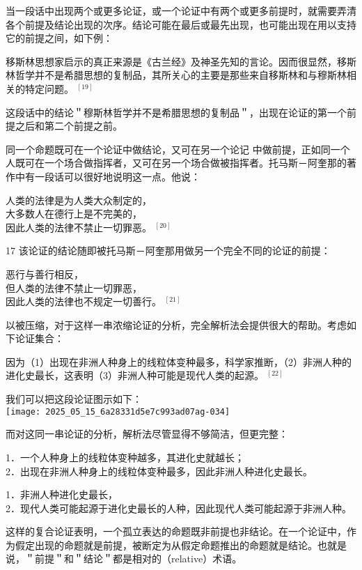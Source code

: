 当一段话中出现两个或更多论证，或一个论证中有两个或更多前提时，就需要弄清各个前提及结论出现的次序。结论可能在最后或最先出现，也可能出现在用以支持它的前提之间，如下例：

移斯林思想家启示的真正来源是《古兰经》及神圣先知的言论。因而很显然，移斯林哲学并不是希腊思想的复制品，其所关心的主要是那些来自移斯林和与穆斯林相关的特定问题。 ${ }^{[19]}$

这段话中的结论＂穆斯林哲学并不是希腊思想的复制品＂，出现在论证的第一个前提之后和第二个前提之前。

同一个命题既可在一个论证中做结论，又可在另一个论记 中做前提，正如同一个人既可在一个场合做指挥者，又可在另一个场合做被指挥者。托马斯－阿奎那的著作中有一段话可以很好地说明这一点。他说：

\begin{displayquote}
人类的法律是为人类大众制定的，\\
大多数人在德行上是不完美的，\\
因此人类的法律不禁止一切罪恶。 ${ }^{[20]}$
\end{displayquote}

17 该论证的结论随即被托马斯－阿奎那用做另一个完全不同的论证的前提：

\begin{displayquote}
恶行与善行相反，\\
但人类的法律不禁止一切罪恶，\\
因此人类的法律也不规定一切善行。 ${ }^{[21]}$
\end{displayquote}

以被压缩，对于这样一串浓缩论证的分析，完全解析法会提供很大的帮助。考虑如下论证集合：

因为（1）出现在非洲人种身上的线粒体变种最多，科学家推断，（2）非洲人种的进化史最长，这表明（3）非洲人种可能是现代人类的起源。 ${ }^{[22]}$

我们可以把这段论证图示如下：\\
\texttt{[image: 2025\_05\_15\_6a28331d5e7c993ad07ag-034]}

而对这同一串论证的分析，解析法尽管显得不够简洁，但更完整：

1．一个人种身上的线粒体变种越多，其进化史就越长；\\
2．出现在非洲人种身上的线粒体变种最多，因此非洲人种进化史最长。

1．非洲人种进化史最长，\\
2．现代人类可能起源于进化史最长的人种，因此现代人类可能起源于非洲人种。

这样的复合论证表明，一个孤立表达的命题既非前提也非结论。在一个论证中，作为假定出现的命题就是前提，被断定为从假定命题推出的命题就是结论。也就是说，＂前提＂和＂结论＂都是相对的（relative）术语。

